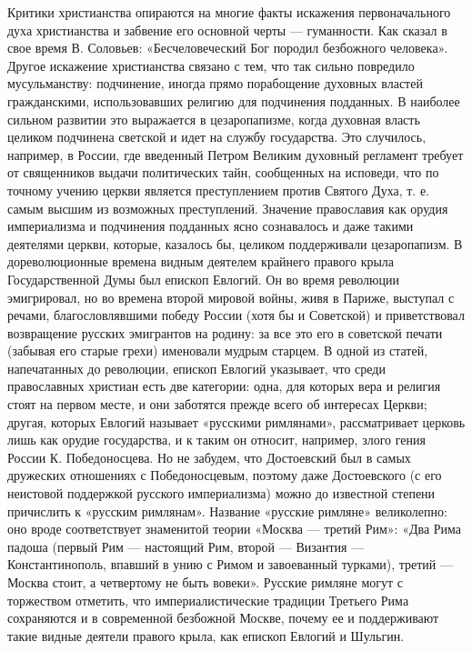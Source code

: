 Критики христианства опираются на многие факты искажения первоначального духа
христианства и забвение его основной черты --- гуманности. Как сказал в свое
время В. Соловьев: «Бесчеловеческий Бог породил безбожного человека». Другое
искажение христианства связано с тем, что так сильно повредило мусульманству:
подчинение, иногда прямо порабощение духовных властей гражданскими,
использовавших религию для подчинения подданных. В наиболее сильном развитии
это выражается в цезаропапизме, когда духовная власть целиком подчинена
светской и идет на службу государства. Это случилось, например, в России, где
введенный Петром Великим духовный регламент требует от священников выдачи
политических тайн, сообщенных на исповеди, что по точному учению церкви
является преступлением против Святого Духа, т. е. самым высшим из возможных
преступлений. Значение православия как орудия империализма и подчинения
подданных ясно сознавалось и даже такими деятелями церкви, которые, казалось
бы, целиком поддерживали цезаропапизм. В дореволюционные времена видным
деятелем крайнего правого крыла Государственной Думы был епископ Евлогий. Он во
время революции эмигрировал, но во времена второй мировой войны, живя в Париже,
выступал с речами, благословлявшими победу России (хотя бы и Советской) и
приветствовал возвращение русских эмигрантов на родину: за все это его в
советской печати (забывая его старые грехи) именовали мудрым старцем. В одной
из статей, напечатанных до революции, епископ Евлогий указывает, что среди
православных христиан есть две категории: одна, для которых вера и религия
стоят на первом месте, и они заботятся прежде всего об интересах Церкви;
другая, которых Евлогий называет «русскими римлянами», рассматривает церковь
лишь как орудие государства, и к таким он относит, например, злого гения России
К. Победоносцева. Но не забудем, что Достоевский был в самых дружеских
отношениях с Победоносцевым, поэтому даже Достоевского (с его неистовой
поддержкой русского империализма) можно до известной степени причислить к
«русским римлянам». Название «русские римляне» великолепно: оно вроде
соответствует знаменитой теории «Москва --- третий Рим»: «Два Рима падоша (первый
Рим --- настоящий Рим, второй --- Византия --- Константинополь, впавший в унию с
Римом и завоеванный турками), третий --- Москва стоит, а четвертому не быть
вовеки». Русские римляне могут с торжеством отметить, что империалистические
традиции Третьего Рима сохраняются и в современной безбожной Москве, почему ее
и поддерживают такие видные деятели правого крыла, как епископ Евлогий и
Шульгин.


